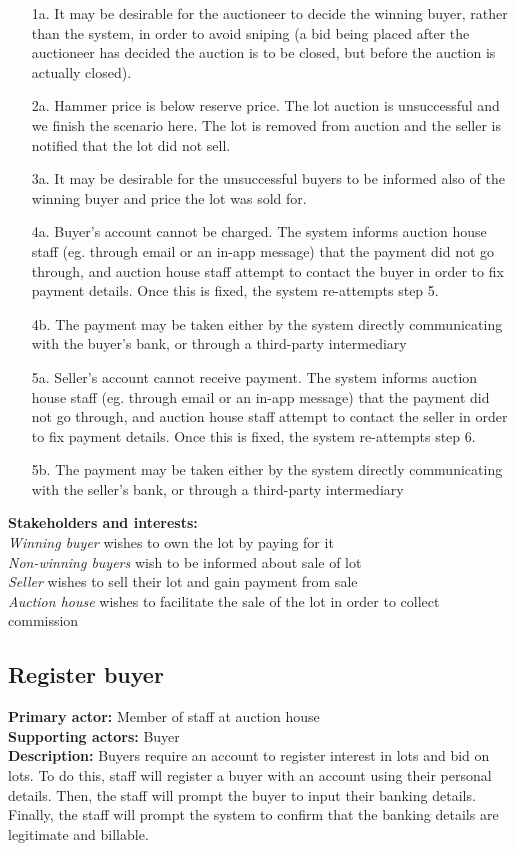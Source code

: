 \documentclass[titlepage, 12pt]{extarticle}
\begin{document}
\begin{itemize}
\item [1a.] It may be desirable for the auctioneer to decide the winning buyer, rather than the system, in order to avoid sniping (a bid being placed after the auctioneer has decided the auction is to be closed, but before the auction is actually closed). 
\item [2a.] Hammer price is below reserve price. The lot auction is unsuccessful and we finish the scenario here. The lot is removed from auction and the seller is notified that the lot did not sell.
\item [3a.] It may be desirable for the unsuccessful buyers to be informed also of the winning buyer and price the lot was sold for. 
\item [4a.] Buyer's account cannot be charged.  The system informs auction house staff (eg. through email or an in-app message) that the payment did not go through, and auction house staff attempt to contact the buyer in order to fix payment details. Once this is fixed, the system re-attempts step 5.
\item [4b.] The payment may be taken either by the system directly communicating with the buyer's bank, or through a third-party intermediary
\item [5a.] Seller's account cannot receive payment. The system informs auction house staff (eg. through email or an in-app message) that the payment did not go through, and auction house staff attempt to contact the seller in order to fix payment details. Once this is fixed, the system re-attempts step 6.
\item [5b.] The payment may be taken either by the system directly communicating with the seller's bank, or through a third-party intermediary
\end{itemize}
{\bf Stakeholders and interests: }
\\{\em Winning buyer} wishes to own the lot by paying for it
\\{\em Non-winning buyers} wish to be informed about sale of lot
\\{\em Seller} wishes to sell their lot and gain payment from sale
\\{\em Auction house} wishes to facilitate the sale of the lot in order to collect commission
\subsection{Register buyer}
{\bf Primary actor: } Member of staff at auction house
\\{\bf Supporting actors: } Buyer
\\{\bf Description: } Buyers require an account to register interest in lots and bid on lots. To do this, staff will register a buyer with an account using their personal details. Then, the staff will prompt the buyer to input their banking details. Finally, the staff will prompt the system to confirm that the banking details are legitimate and billable.
\end{document}

